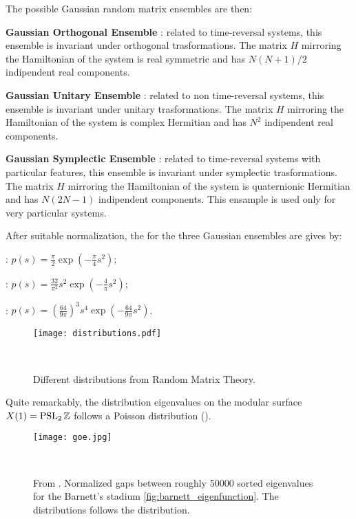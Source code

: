 The possible Gaussian random matrix ensembles are then:
\begin{compactitem}[1)]
\item \textbf{Gaussian Orthogonal Ensemble} \GOE : related to time-reversal systems, this ensemble is invariant under orthogonal trasformations. The matrix $H$ mirroring the Hamiltonian of the system is real symmetric and has $N(N+1)/2$ indipendent real components.   
\item \textbf{Gaussian Unitary Ensemble} \GUE : related to  non time-reversal systems, this ensemble is invariant under unitary trasformations. The matrix $H$ mirroring the Hamiltonian of the system is complex Hermitian and has $N^{2}$ indipendent real components.
\item \textbf{Gaussian Symplectic Ensemble} \GSE : related to time-reversal systems with particular features, this ensemble is invariant under symplectic trasformations. The matrix $H$ mirroring the Hamiltonian of the system is quaternionic Hermitian and has $N(2N-1)$ indipendent components. This ensample is used only for very particular systems.
\end{compactitem}

After suitable normalization, the \NNSD for the three Gaussian ensembles are gives by:
\begin{compactitem}
\item \GOE: $p(s)=\frac{\pi}{2}\exp\left(-\frac{\pi}{4}s^{2}\right)$;
\item \GUE: $p(s)=\frac{32}{\pi^{2}}s^{2}\exp\left(-\frac{4}{\pi}s^{2}\right)$;
\item \GSE: $p(s)=\left(\frac{64}{9\pi}\right)^{3}s^{4}\exp\left(-\frac{64}{9\pi}s^{2}\right)$.
\end{compactitem}

\begin{figure}[H]
\centering

    \texttt{[image: distributions.pdf]}

  \noindent\\

  \decoRule
  \caption{Different distributions from Random Matrix Theory.}
  \label{fig:different_distributions}
\end{figure}


Quite remarkably, the distribution eigenvalues on the modular surface $X(1)=\operatorname{PSL}_{2}\mathbb{Z}$ follows a Poisson distribution (\cite{Rudnick:whatIs}).


\begin{figure}[H]
\centering

    \texttt{[image: goe.jpg]}

  \noindent\\

  \decoRule
  \caption{From \cite{Rudnick:whatIs}. Normalized gaps
between roughly 50000 sorted eigenvalues
for the Barnett's stadium \ref{fig:barnett_eigenfunction}. The distributions follows the \GOE distribution.}
  \label{fig:goe_distrib}
\end{figure}


